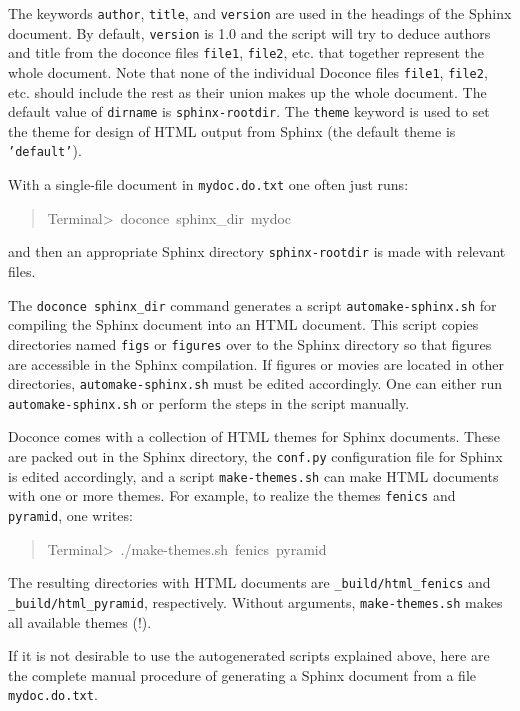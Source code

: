 \documentclass[a4paper]{article}
\begin{document}
The keywords \texttt{author}, \texttt{title}, and \texttt{version} are used in the headings
of the Sphinx document. By default, \texttt{version} is 1.0 and the script
will try to deduce authors and title from the doconce files \texttt{file1},
\texttt{file2}, etc. that together represent the whole document. Note that
none of the individual Doconce files \texttt{file1}, \texttt{file2}, etc. should
include the rest as their union makes up the whole document.
The default value of \texttt{dirname} is \texttt{sphinx-rootdir}. The \texttt{theme}
keyword is used to set the theme for design of HTML output from
Sphinx (the default theme is \texttt{'default'}).

With a single-file document in \texttt{mydoc.do.txt} one often just runs:
%
\begin{quote}{\ttfamily \raggedright \noindent
Terminal>~doconce~sphinx\_dir~mydoc
}
\end{quote}

and then an appropriate Sphinx directory \texttt{sphinx-rootdir} is made with
relevant files.

The \texttt{doconce sphinx\_dir} command generates a script
\texttt{automake-sphinx.sh} for compiling the Sphinx document into an HTML
document.  This script copies directories named \texttt{figs} or \texttt{figures}
over to the Sphinx directory so that figures are accessible in the
Sphinx compilation.  If figures or movies are located in other
directories, \texttt{automake-sphinx.sh} must be edited accordingly. One
can either run \texttt{automake-sphinx.sh} or perform the steps in the
script manually.

Doconce comes with a collection of HTML themes for Sphinx documents.
These are packed out in the Sphinx directory, the \texttt{conf.py}
configuration file for Sphinx is edited accordingly, and a script
\texttt{make-themes.sh} can make HTML documents with one or more themes.
For example,
to realize the themes \texttt{fenics} and \texttt{pyramid}, one writes:
%
\begin{quote}{\ttfamily \raggedright \noindent
Terminal>~./make-themes.sh~fenics~pyramid
}
\end{quote}

The resulting directories with HTML documents are \texttt{\_build/html\_fenics}
and \texttt{\_build/html\_pyramid}, respectively. Without arguments,
\texttt{make-themes.sh} makes all available themes (!).

If it is not desirable to use the autogenerated scripts explained
above, here are the complete manual procedure of generating a
Sphinx document from a file \texttt{mydoc.do.txt}.
\end{document}

